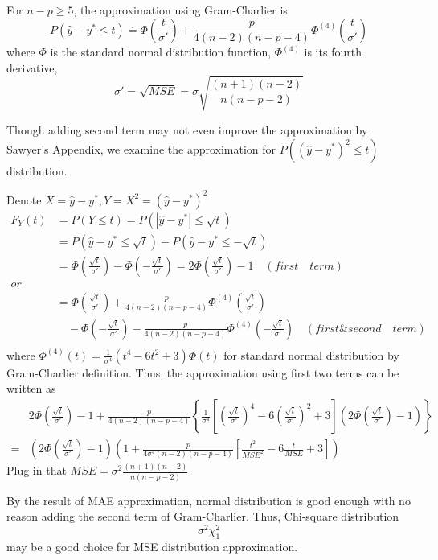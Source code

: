 \documentclass[11pt]{article}
\begin{document}
For $n-p\geq 5$, the approximation using Gram-Charlier is
\begin{equation}\label{normal1}
P(\hat{y}-y^*\leq t) \doteq \Phi\left(\frac{t}{\sigma'}\right)+\frac{p}{4(n-2)(n-p-4)}\Phi^{(4)}\left(\frac{t}{\sigma'}\right)
\end{equation}
 where $\Phi$ is the standard normal distribution function, $\Phi^{(4)}$ is its fourth derivative, $$\sigma' = \sqrt{MSE} = \sigma \sqrt{\frac{(n+1)(n-2)}{n(n-p-2)}}$$
 
Though adding second term may not even improve the approximation by Sawyer's Appendix, we examine the approximation for $P((\hat{y}-y^*)^2\leq t)$ distribution.

Denote $X = \hat{y}-y^*, Y = X^2= (\hat{y}-y^*)^2 $
$$\begin{aligned}
F_Y(t) &= P(Y\leq t) = P(|\hat{y}-y^*|\leq \sqrt{t})\\
		 &= P(\hat{y}-y^*\leq \sqrt{t})-P(\hat{y}-y^*\leq -\sqrt{t})\\
		 &= \Phi(\frac{\sqrt{t}}{\sigma'})-\Phi(-\frac{\sqrt{t}}{\sigma'}) = 2 \Phi(\frac{\sqrt{t}}{\sigma'})-1 \quad(first \quad term)\\
		 or\\
		 &= \Phi(\frac{\sqrt{t}}{\sigma'})+\frac{p}{4(n-2)(n-p-4)}\Phi^{(4)}(\frac{\sqrt{t}}{\sigma'})\\
		 &\quad-\Phi(-\frac{\sqrt{t}}{\sigma'})- \frac{p}{4(n-2)(n-p-4)}\Phi^{(4)}(-\frac{\sqrt{t}}{\sigma'})\quad(first\&second \quad term)\\
\end{aligned}$$
where $\Phi^{(4)}(t) = \frac{1}{\sigma^4}(t^4-6t^2+3)\Phi(t)$ for standard normal distribution by Gram-Charlier definition. Thus, the approximation using first two terms can be written as 
\begin{equation}\label{normal2}
\begin{aligned}
&2\Phi(\frac{\sqrt{t}}{\sigma'})-1+ \frac{p}{4(n-2)(n-p-4)}\left\{\frac{1}{\sigma^4}\left[(\frac{\sqrt{t}}{\sigma'})^4-6(\frac{\sqrt{t}}{\sigma'})^2+3\right]\left(2\Phi(\frac{\sqrt{t}}{\sigma'})-1\right)\right\}\\
=&\left(2\Phi(\frac{\sqrt{t}}{\sigma'})-1\right)\left( 1+\frac{p}{4\sigma^4(n-2)(n-p-4)}\left[\frac{t^2}{MSE^2}-6\frac{t}{MSE}+3\right]\right)
\end{aligned}\end{equation}
Plug in that $MSE = \sigma^2\frac{(n+1)(n-2)}{n(n-p-2)}$

By the result of MAE approximation, normal distribution is good enough with no reason adding the second term of Gram-Charlier. Thus, Chi-square distribution  \begin{equation}\label{chis}
\sigma^2 \chi ^2_1\end{equation}  may be a good choice for MSE distribution approximation. 
\end{document}
